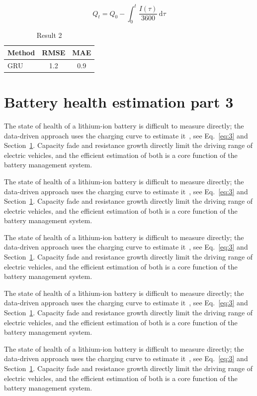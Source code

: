 \documentclass[11pt]{article}
\begin{document}
\begin{equation}\label{eq:2}
  Q_t = Q_0 - \int_0^t \frac{I(\tau)}{3600}\,\mathrm{d}\tau
\end{equation}
\begin{table}[h]\centering\begin{tabular}{lcc}\toprule Method & RMSE & MAE\\\midrule GRU & 1.2 & 0.9\\\bottomrule\end{tabular}\caption{Result 2}\end{table}

\section{Battery health estimation part 3}\label{sec:3}
The state of health of a lithium-ion battery is difficult to measure directly; the data-driven approach uses the charging curve to estimate it~\cite{a2020}, see Eq.~\eqref{eq:3} and Section~\ref{sec:3}. Capacity fade and resistance growth directly limit the driving range of electric vehicles, and the efficient estimation of both is a core function of the battery management system.

The state of health of a lithium-ion battery is difficult to measure directly; the data-driven approach uses the charging curve to estimate it~\cite{a2020}, see Eq.~\eqref{eq:3} and Section~\ref{sec:3}. Capacity fade and resistance growth directly limit the driving range of electric vehicles, and the efficient estimation of both is a core function of the battery management system.

The state of health of a lithium-ion battery is difficult to measure directly; the data-driven approach uses the charging curve to estimate it~\cite{a2020}, see Eq.~\eqref{eq:3} and Section~\ref{sec:3}. Capacity fade and resistance growth directly limit the driving range of electric vehicles, and the efficient estimation of both is a core function of the battery management system.

The state of health of a lithium-ion battery is difficult to measure directly; the data-driven approach uses the charging curve to estimate it~\cite{a2020}, see Eq.~\eqref{eq:3} and Section~\ref{sec:3}. Capacity fade and resistance growth directly limit the driving range of electric vehicles, and the efficient estimation of both is a core function of the battery management system.

The state of health of a lithium-ion battery is difficult to measure directly; the data-driven approach uses the charging curve to estimate it~\cite{a2020}, see Eq.~\eqref{eq:3} and Section~\ref{sec:3}. Capacity fade and resistance growth directly limit the driving range of electric vehicles, and the efficient estimation of both is a core function of the battery management system.
\end{document}
